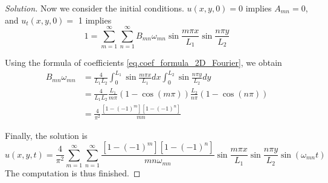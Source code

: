 \begin{proof}[Solution]
Now we consider the initial conditions. $u(x, y, 0)=0$ implies $A_{m n}=0$, and $u_t(x, y, 0)=$ 1 implies
$$
1=\sum_{m=1}^{\infty} \sum_{n=1}^{\infty} B_{m n} \omega_{m n} \sin \frac{m \pi x}{L_1} \sin \frac{n \pi y}{L_2}
$$

Using the formula of coefficients \eqref{eq.coef_formula_2D_Fourier}, we obtain
$$
\begin{aligned}
B_{m n} \omega_{m n} & =\frac{4}{L_1 L_2} \int_0^{L_1} \sin \frac{m \pi x}{L_1} d x \int_0^{L_2} \sin \frac{n \pi y}{L_2} d y \\
& =\frac{4}{L_1 L_2} \frac{L_1}{m \pi}(1-\cos (m \pi)) \frac{L_2}{n \pi}(1-\cos (n \pi)) \\
& =\frac{4}{\pi^2} \frac{\left[1-(-1)^m\right]\left[1-(-1)^n\right]}{m n}
\end{aligned}
$$

Finally, the solution is
$$
u(x, y, t)=\frac{4}{\pi^2} \sum_{m=1}^{\infty} \sum_{n=1}^{\infty} \frac{\left[1-(-1)^m\right]\left[1-(-1)^n\right]}{m n \omega_{m n}} \sin \frac{m \pi x}{L_1} \sin \frac{n \pi y}{L_2} \sin \left(\omega_{m n} t\right)
$$
The computation is thus finished.
\end{proof}